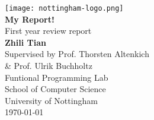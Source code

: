 \documentclass{report}
\begin{document}
\begin{titlepage}
    \centering
    
    \texttt{[image: nottingham-logo.png]} \\[1.5cm]
    
    {\huge \textbf{My Report!}} \\[0.5cm]
    {\huge First year review report} \\[2cm]
    
    {\huge \textbf{Zhili Tian}} \\[0.3cm]
    {\large Supervised by Prof. Thorsten Altenkich} \\ [0.3cm]
    {\large \& Prof. Ulrik Buchholtz} \\[1.5cm]

    {\large Funtional Programming Lab} \\[0.3cm]    
    {\large School of Computer Science} \\[0.3cm]
    {\large University of Nottingham} \\[2cm]
    
    {\large \today}
    
    \vfill
\end{titlepage}



\tableofcontents










\end{document}
